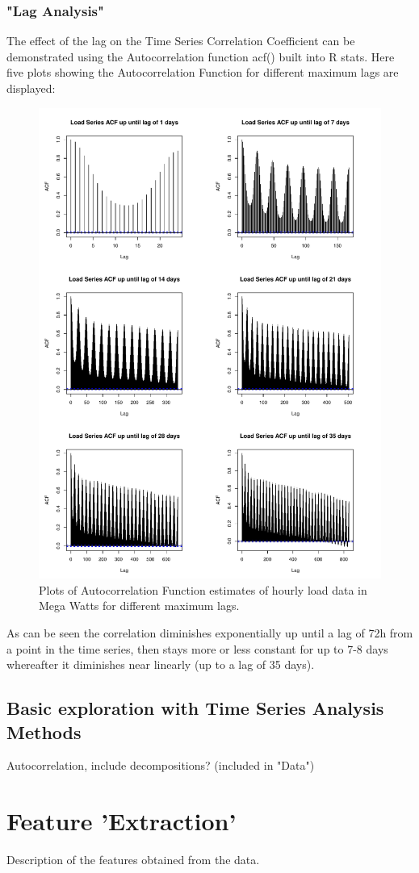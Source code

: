 \documentclass{article}
\begin{document}
\subsubsection{"Lag Analysis"}
The effect of the lag on the Time Series Correlation Coefficient can be demonstrated using the Autocorrelation function acf() built into R stats. Here five plots showing the Autocorrelation Function for different maximum lags are displayed: 
\begin{figure}[h!]
\centering
\includegraphics[width=.7\textwidth]{../data/analysis/acf-load-lag-var-days_font.pdf}
\caption{Plots of Autocorrelation Function estimates of hourly load data in Mega Watts for different maximum lags.}
\label{fig:load-acf}
\end{figure}

As can be seen the correlation diminishes exponentially up until a lag of 72h from a point in the time series, then stays more or less constant for up to 7-8 days whereafter it diminishes near linearly (up to a lag of 35 days). 
\subsection{Basic exploration with Time Series Analysis Methods}
Autocorrelation, include decompositions? (included in "Data")

\section{Feature 'Extraction'}
Description of the features obtained from the data. 
\end{document}
